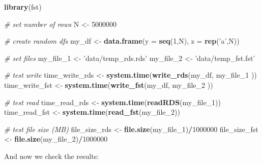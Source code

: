 \documentclass[
  12pt,
]{book}
\newenvironment{Shaded}{\begin{snugshade}}{\end{snugshade}}
\newcommand{\CommentTok}[1]{\textcolor[rgb]{0.37,0.37,0.37}{\textit{#1}}}
\newcommand{\DataTypeTok}[1]{\textcolor[rgb]{0.27,0.27,0.27}{#1}}
\newcommand{\DecValTok}[1]{\textcolor[rgb]{0.06,0.06,0.06}{#1}}
\newcommand{\KeywordTok}[1]{\textcolor[rgb]{0.27,0.27,0.27}{\textbf{#1}}}
\newcommand{\NormalTok}[1]{#1}
\newcommand{\OperatorTok}[1]{\textcolor[rgb]{0.43,0.43,0.43}{\textbf{#1}}}
\newcommand{\StringTok}[1]{\textcolor[rgb]{0.5,0.5,0.5}{#1}}
\begin{document}
\begin{Shaded}
\begin{Highlighting}[]
\KeywordTok{library}\NormalTok{(fst)}

\CommentTok{# set number of rows}
\NormalTok{N <-}\StringTok{ }\DecValTok{5000000}

\CommentTok{# create random dfs}
\NormalTok{my_df <-}\StringTok{ }\KeywordTok{data.frame}\NormalTok{(}\DataTypeTok{y =} \KeywordTok{seq}\NormalTok{(}\DecValTok{1}\NormalTok{,N),}
                    \DataTypeTok{z =} \KeywordTok{rep}\NormalTok{(}\StringTok{'a'}\NormalTok{,N))}

\CommentTok{# set files}
\NormalTok{my_file_}\DecValTok{1}\NormalTok{ <-}\StringTok{ 'data/temp_rds.rds'}
\NormalTok{my_file_}\DecValTok{2}\NormalTok{ <-}\StringTok{ 'data/temp_fst.fst'}

\CommentTok{# test write}
\NormalTok{time_write_rds <-}\StringTok{ }\KeywordTok{system.time}\NormalTok{(}\KeywordTok{write_rds}\NormalTok{(my_df, my_file_}\DecValTok{1}\NormalTok{ ))}
\NormalTok{time_write_fst <-}\StringTok{ }\KeywordTok{system.time}\NormalTok{(}\KeywordTok{write_fst}\NormalTok{(my_df, my_file_}\DecValTok{2}\NormalTok{ ))}

\CommentTok{# test read}
\NormalTok{time_read_rds <-}\StringTok{ }\KeywordTok{system.time}\NormalTok{(}\KeywordTok{readRDS}\NormalTok{(my_file_}\DecValTok{1}\NormalTok{))}
\NormalTok{time_read_fst <-}\StringTok{ }\KeywordTok{system.time}\NormalTok{(}\KeywordTok{read_fst}\NormalTok{(my_file_}\DecValTok{2}\NormalTok{))}

\CommentTok{# test file size (MB)}
\NormalTok{file_size_rds <-}\StringTok{ }\KeywordTok{file.size}\NormalTok{(my_file_}\DecValTok{1}\NormalTok{)}\OperatorTok{/}\DecValTok{1000000}
\NormalTok{file_size_fst <-}\StringTok{ }\KeywordTok{file.size}\NormalTok{(my_file_}\DecValTok{2}\NormalTok{)}\OperatorTok{/}\DecValTok{1000000}
\end{Highlighting}
\end{Shaded}

And now we check the results:
\end{document}
